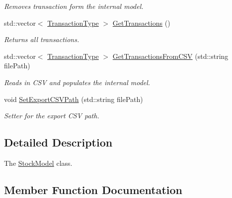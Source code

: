 \begin{DoxyCompactItemize}
\begin{DoxyCompactList}\small\item\em Removes transaction form the internal model. \end{DoxyCompactList}\item 
\mbox{\label{class_stock_model_ac11ae61c7217b569205d135d33c34008}} 
std\+::vector$<$ \mbox{\hyperlink{class_transaction_type}{Transaction\+Type}} $>$ \mbox{\hyperlink{class_stock_model_ac11ae61c7217b569205d135d33c34008}{Get\+Transactions}} ()
\begin{DoxyCompactList}\small\item\em Returns all transactions. \end{DoxyCompactList}\item 
std\+::vector$<$ \mbox{\hyperlink{class_transaction_type}{Transaction\+Type}} $>$ \mbox{\hyperlink{class_stock_model_a88b3101a6ffcfa31ef3a6058c8d6c990}{Get\+Transactions\+From\+C\+SV}} (std\+::string file\+Path)
\begin{DoxyCompactList}\small\item\em Reads in C\+SV and populates the internal model. \end{DoxyCompactList}\item 
void \mbox{\hyperlink{class_stock_model_a4b0150fddd7fe2686b693f877ba84cac}{Set\+Export\+C\+S\+V\+Path}} (std\+::string file\+Path)
\begin{DoxyCompactList}\small\item\em Setter for the export C\+SV path. \end{DoxyCompactList}\end{DoxyCompactItemize}


\subsection{Detailed Description}
The \mbox{\hyperlink{class_stock_model}{Stock\+Model}} class. 

\subsection{Member Function Documentation}
\mbox{\label{class_stock_model_a6461b20ecb47314c9799a916f42e7e5d}} 
